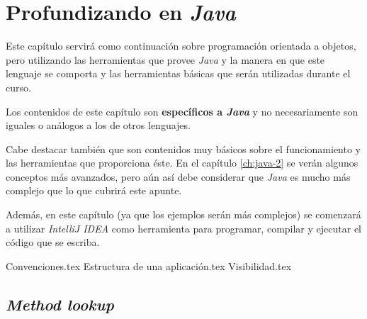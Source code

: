 \chapter{Profundizando en \textit{Java}}
  \label{ch:java}
  Este capítulo servirá como continuación sobre programación orientada a objetos, pero 
  utilizando las herramientas que provee \textit{Java} y la manera en que este lenguaje se
  comporta y las herramientas básicas que serán utilizadas durante el curso.

  Los contenidos de este capítulo son \textbf{específicos a \textit{Java}} y no 
  necesariamente son iguales o análogos a los de otros lenguajes.

  Cabe destacar también que son contenidos muy básicos sobre el funcionamiento y las 
  herramientas que proporciona éste.
  En el capítulo \ref{ch:java-2} se verán algunos conceptos más avanzados, pero aún así
  debe considerar que \textit{Java} es mucho más complejo que lo que cubrirá este apunte.

  Además, en este capítulo (ya que los ejemplos serán más complejos) se comenzará a 
  utilizar \textit{IntelliJ IDEA} como herramienta para programar, compilar y ejecutar 
  el código que se escriba.

  {Convenciones.tex}
  {Estructura de una aplicación.tex}
  {Visibilidad.tex}
  \section{\textit{Method lookup}}
    \label{sec:lookup}
%